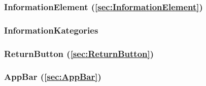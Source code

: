 \documentclass{entwurfsheft}
\begin{document}
\subsubsection*{InformationElement (\ref{sec:InformationElement})}

\subsubsection*{InformationKategories}

\subsubsection*{ReturnButton (\ref{sec:ReturnButton})}

\subsubsection*{AppBar (\ref{sec:AppBar})}
\end{document}
